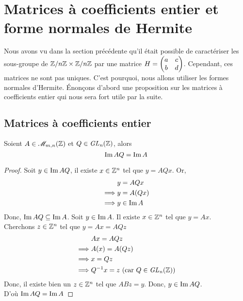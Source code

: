 \documentclass[12pt]{article}
\newcommand{\ZnZ}{\Z/n\Z}
\newcommand{\ZZ}{\ZnZ \x \ZnZ}
\begin{document}
\newpage
\section{Matrices à coefficients entier et forme normales de Hermite}
Nous avons vu dans la section précédente qu'il était possible de caractériser les sous-groupe de
$\ZZ$ par une matrice $H = \begin{pmatrix} a & c\\ b & d \end{pmatrix}$. Cependant, ces matrices ne sont pas uniques. C'est
pourquoi, nous allons utiliser les formes normales d'Hermite.
Énonçons d'abord une proposition sur les matrices à coefficients entier qui nous sera fort
utile par la suite.

\subsection{Matrices à coefficients entier}
\begin{proposition}\label{ima_imaq}
	Soient $A \in \mathscr{M}_{m,n}(\mathbb Z)$ et $Q \in \it {GL}_n(\mathbb Z)$, alors
	$$\operatorname{Im} AQ = \operatorname{Im} A$$
\end{proposition}
\begin{proof}
	Soit $y \in \operatorname{Im} AQ$, il existe $x \in \mathbb Z^n$ tel que $y = AQx$. Or,
	\begin{align*}
		         & y = AQx     \\
		\implies & y = A(Qx)   \\
		\implies & y \in \operatorname{Im} A
	\end{align*}
	Donc, $\operatorname{Im} AQ \subseteq \operatorname{Im} A$.
	Soit $y \in \operatorname{Im} A$. Il existe $x \in \mathbb Z^n$ tel que $y = Ax$.\\
	Cherchons $z \in \mathbb Z^n$ tel que $y = Ax = AQz$
	\begin{align*}
		         & Ax = AQz                                     \\
		\implies & A(x) = A(Qz)                                 \\
		\implies & x = Qz                                       \\
		\implies & Q^{-1} x = z \text{ (car $Q \in \it {GL}_n(\mathbb Z)$)}
	\end{align*}
	Donc, il existe bien un $z \in \mathbb Z^n$ tel que $ABz = y$. Donc, $y \in \operatorname{Im} AQ$.\\
	D'où $\operatorname{Im} AQ = \operatorname{Im} A$

\end{proof}

\newpage
\end{document}
